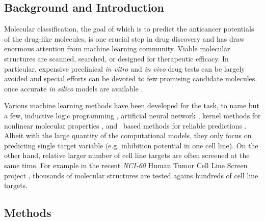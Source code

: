 {\subsection{Background and Introduction}

Molecular classification, the goal of which is to predict the anticancer potentials of the drug-like molecules, is one crucial step in drug discovery and has draw enormous attention from machine learning community.
Viable molecular structures are scanned, searched, or designed for therapeutic efficacy.
In particular, expensive preclinical \textit{in vitro} and \textit{in vivo} drug tests can be largely avoided and special efforts can be devoted to few promising candidate molecules, once accurate \textit{in silico} models are available \citep{Burbidg01drug}.

Various machine learning methods have been developed for the task, to name but a few, inductive logic programming \citep{King96structure}, artificial neural network \citep{Bernazzani06predicting}, kernel methods for nonlinear molecular properties \citep{Trotter01drug,Ralaivola05graph,Swamidass05kernel,Ceroni07classification}, and \svm\ based methods for reliable predictions \citep{Trotter01drug,Byvatov03comparison,Xue04effect}.
Albeit with the large quantity of the computational models, they only focus on predicting single target variable (e.g. inhibition potential in one cell line). 
On the other hand, relative larger number of cell line targets are often screened at the same time.
For example in the recent \textit{NCI-60} {Human Tumor Cell Line Screen} project \citep{Shoemaker06the}, thousands of molecular structures are tested agains hundreds of cell line targets.


\subsection{Methods}

}
